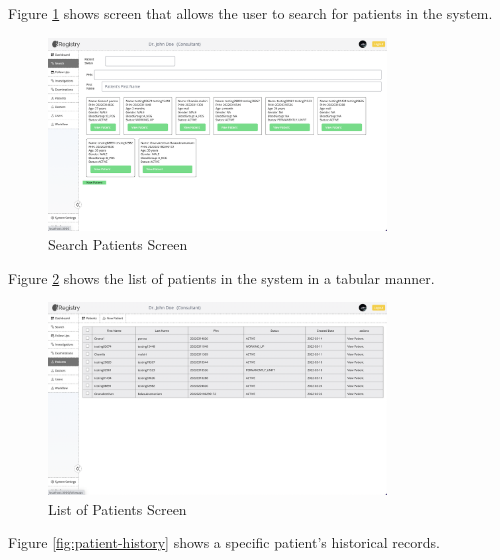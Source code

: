 \documentclass[12pt,a4paper]{report}
\begin{document}
Figure \ref{fig:search-layout} shows screen that allows the user to search for patients in the system. 

\begin{figure}[hbp]
\begin{center}
\includegraphics[width=0.8\textwidth,scale=0.25]{images/search.png}	
\end{center}
\caption{Search Patients Screen}
\label{fig:search-layout}
\end{figure}



Figure \ref{fig:patient-list} shows the list of patients in the system in a tabular manner. 


\begin{figure}[hbp]
\begin{center}
\includegraphics[width=0.8\textwidth,scale=0.25]{images/patients-list.png}	
\end{center}
\caption{List of Patients Screen}
\label{fig:patient-list}
\end{figure}




Figure \ref{fig:patient-history} shows a specific patient's historical records. 
\end{document}
